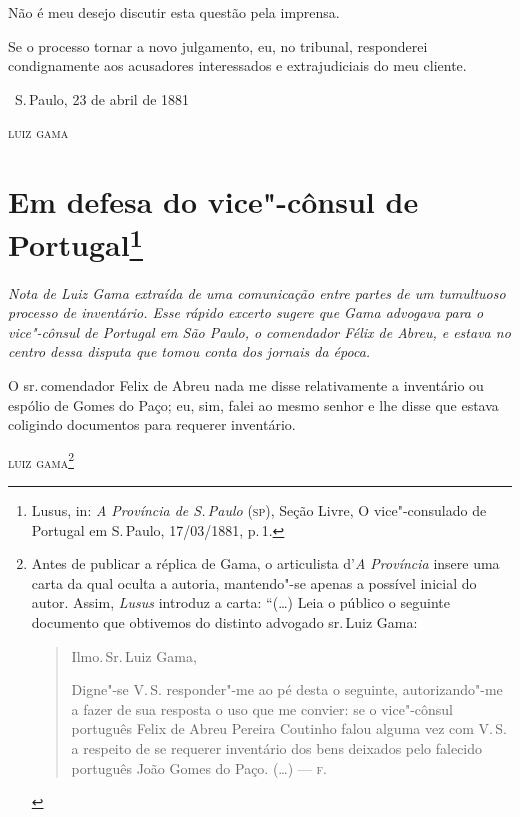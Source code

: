 Não é meu desejo discutir esta questão pela imprensa.

Se o processo tornar a novo julgamento, eu, no tribunal, responderei
condignamente aos acusadores interessados e extrajudiciais do meu
cliente.

\vfill

\hfill\ S.\,Paulo, 23 de abril de 1881\enlargethispage{\baselineskip}

\hfill\textsc{luiz gama}

\chapter{Em defesa do vice"-cônsul de Portugal\footnote[*]{Lusus, in: \emph{A Província de S.\,Paulo} (\textsc{sp}), Seção Livre, O vice"-consulado de Portugal em S.\,Paulo, 17/03/1881, p.\,1.}}

\begin{flushleft}
{\footnotesize\itshape
Nota de Luiz Gama extraída de uma comunicação entre partes de um
tumultuoso processo de inventário. Esse rápido excerto sugere que Gama
advogava para o vice"-cônsul de Portugal em São Paulo, o comendador Félix
de Abreu, e estava no centro dessa disputa que tomou conta dos jornais
da época.}
\end{flushleft}

O sr.\,comendador Felix de Abreu nada me disse relativamente a inventário
ou espólio de Gomes do Paço; eu, sim, falei ao mesmo senhor e lhe disse
que estava coligindo documentos para requerer inventário.

\bigskip

\hfill\textsc{luiz gama}\footnote{Antes de publicar a réplica de Gama, o
  articulista d'\emph{A Província} insere uma carta da qual
  oculta a autoria, mantendo"-se apenas a possível inicial do autor.
  Assim, \emph{Lusus} introduz a carta: ``(\ldots{}) Leia o público o seguinte
  documento que obtivemos do distinto advogado sr.\,Luiz Gama:

\begin{quote}\footnotesize
Ilmo.\,Sr.\,Luiz Gama,

  Digne"-se V.\,S. responder"-me ao pé desta o seguinte, autorizando"-me a
  fazer de sua resposta o uso que me convier: se o vice"-cônsul português
  Felix de Abreu Pereira Coutinho falou alguma vez com V.\,S. a respeito
  de se requerer inventário dos bens deixados pelo falecido português
  João Gomes do Paço. (\ldots{}) --- \textsc{f}.
  \end{quote}}


